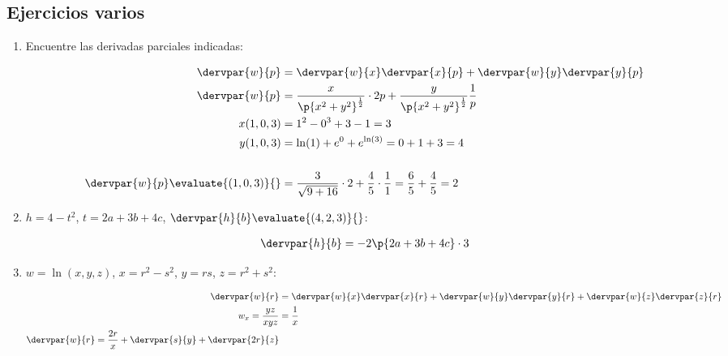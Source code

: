 \documentclass{article}
\begin{document}
\subsection{Ejercicios varios}
\begin{enumerate}
    \item Encuentre las derivadas parciales indicadas:
        \begin{center}
        \begin{align*}

            \dervpar{w}{p} &= \dervpar{w}{x} \dervpar{x}{p} + \dervpar{w}{y} \dervpar{y}{p} \\ 
            \dervpar{w}{p} &= \frac{x}{\p{x^2+y^2}^{\frac{1}{2} }}\cdot 2p + \frac{y}{\p{x^2+y^2}^{\frac{1}{2}}} \frac{1}{p}   \\ 
            x(1,0,3) &= 1^2-0^3+3-1=3 \\ 
            y (1,0,3) &= \ln(1)+e^0+e^{\ln(3)}=0+1+3=4 \\ 
            \\ 
            \dervpar{w}{p} \evaluate{(1,0,3)}{} &= \frac{3}{\sqrt{9+16}} \cdot 2 + \frac{4}{5} \cdot \frac{1}{1} = \frac{6}{5} + \frac{4}{5} = 2 \\  
        \end{align*}
        \end{center}

    \item $h=4-t^2$, $t=2a+3b+4c$, $\dervpar{h}{b} \evaluate{(4,2,3)}{} $:
    \begin{center}
       \begin{align*}
           \dervpar{h}{b} &= -2 \p{2a+3b+4c}\cdot 3 \\ 
       \end{align*}
    \end{center}
    
    \item $w=\ln(x,y,z)$, $x=r^2-s^2$, $y=rs$, $z=r^2+s^2$:
        \begin{center}
           \begin{align*}
                \dervpar{w}{r} &= \dervpar{w}{x} \dervpar{x}{r} + \dervpar{w}{y} \dervpar{y}{r} + \dervpar{w}{z} \dervpar{z}{r} \\  
                w_x = \frac{yz}{xyz} &= \frac{1}{x} \\ 
                \dervpar{w}{r} = \frac{2r}{x} + \dervpar{s}{y} + \dervpar{2r}{z} \\ 
           \end{align*}
        \end{center}
\end{enumerate}
\end{document}
